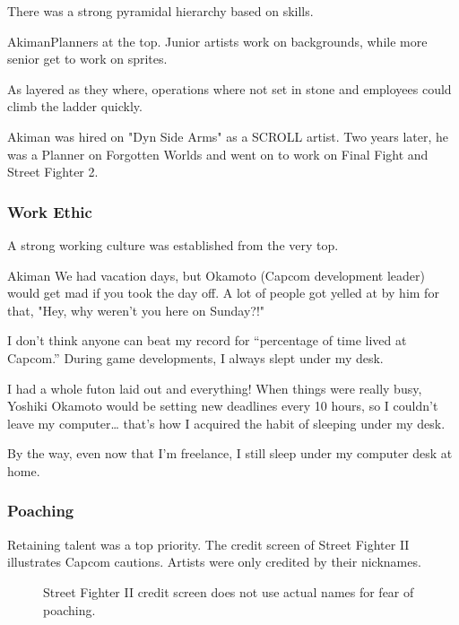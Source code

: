 There was a strong pyramidal hierarchy based on skills. 

\begin{q}{Akiman\cite{akiman2003}}Planners at the top. Junior artists work on backgrounds, while more senior get to work on sprites.
\end{q}

As layered as they where, operations where not set in stone and employees could climb the ladder quickly. 

Akiman was hired on "Dyn Side Arms" as a SCROLL artist. Two years later, he was a Planner on Forgotten Worlds and went on to work on Final Fight and Street Fighter 2.

\subsubsection{Work Ethic}

A strong working culture was established from the very top.

\begin{q}{Akiman\cite{akiman2003}}
  We had vacation days, but Okamoto (Capcom development leader) would get mad if you took the day off. A lot of people got yelled at by him for that, "Hey, why weren’t you here on Sunday?!"

  I don’t think anyone can beat my record for “percentage of time lived at Capcom.” During game developments, I always slept under my desk. 

  I had a whole futon laid out and everything! When things were really busy, Yoshiki Okamoto  would be setting new deadlines every 10 hours, so I couldn't leave my computer… that's how I acquired the habit of sleeping under my desk. 

  By the way, even now that I'm freelance, I still sleep under my computer desk at home.
  \end{q}

\subsubsection{Poaching}


Retaining talent was a top priority. The credit screen of Street Fighter II illustrates Capcom cautions. Artists were only credited by their nicknames.

 \begin{figure}[H]
\caption*{Street Fighter II credit screen does not use actual names for fear of poaching.}
\end{figure}

